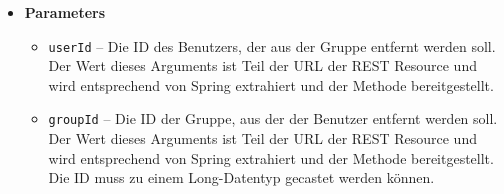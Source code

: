 \documentclass[11pt,a4paper]{article}
\begin{document}
{{{{{{{{{{{{{{{{{{{\begin{itemize}
{\begin{itemize}
{Diese Methode kann von einem Client aufgerufen werden, wenn ein Gruppenmitglied aus einer Gruppe entfernt werden soll. Dies kann der Fall sein, wenn ein Benutzer freiwillig aus einer Gruppe austritt oder wenn er von einem Administrator aus der Gruppe entfernt wird. Bei einem Aufruf leitet die Methode die Anfrage an die entsprechende Methode des groupDAOs weiter. Dies entfernt den Benutzer aus der Gruppe. Durch Foreign Key Constraints in der Datenbank wird der Benutzer auch aus allen GOs der Gruppe entfernt. Darum muss sich diese Methode demnach nicht kümmern. Der Aufruf dieser Methode entspricht einem HTTP POST-Request an den Server an die URL \{Base\_URL\}/groups/members/\{groupId\}/\{userId\}.
}
\item{
{\bf  Parameters}
  \begin{itemize}
   \item{
\texttt{userId} -- Die ID des Benutzers, der aus der Gruppe entfernt werden soll. Der Wert dieses Arguments ist Teil der URL der REST Resource und wird entsprechend von Spring extrahiert und der Methode bereitgestellt.}
   \item{
\texttt{groupId} -- Die ID der Gruppe, aus der der Benutzer entfernt werden soll. Der Wert dieses Arguments ist Teil der URL der REST Resource und wird entsprechend von Spring extrahiert und der Methode bereitgestellt. Die ID muss zu einem Long-Datentyp gecastet werden können.}
  \end{itemize}
}%
\end{itemize}
}%
\end{itemize}
}
}
}}}}}}}}}}}}}}}}}
\end{document}
